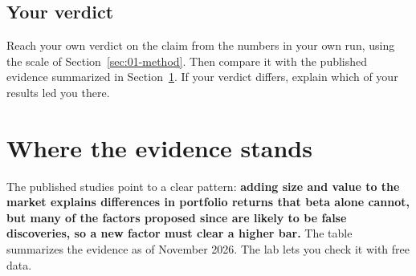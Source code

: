 \subsection*{Your verdict}

Reach your own verdict on the claim from the numbers in your own run, using the scale of Section~\ref{sec:01-method}. Then compare it with the published evidence summarized in Section~\ref{sec:04-verdict}. If your verdict differs, explain which of your results led you there.

\section{Where the evidence stands}
\label{sec:04-verdict}

The published studies point to a clear pattern: \textbf{adding size and value to the market explains differences in portfolio returns that beta alone cannot, but many of the factors proposed since are likely to be false discoveries, so a new factor must clear a higher bar.} The table summarizes the evidence as of November 2026. The lab lets you check it with free data.

